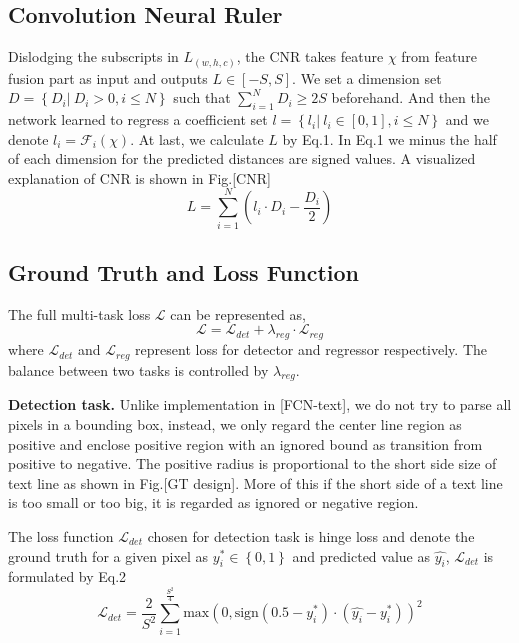 \documentclass[10pt,twocolumn,letterpaper]{article}
\begin{document}
	\subsection{Convolution Neural Ruler}
	Dislodging the subscripts in $L_{\left(w, h, c\right)}$, the CNR takes feature $\chi$ from feature fusion part as input and outputs $L \in \left[-S, S\right]$.
	We set a dimension set $D = \left\{D_i \vert \ D_i > 0, i \leq N \right\}$ such that $\sum_{i = 1}^{N} D_i \geq 2S$ beforehand.
	And then the network learned to regress a coefficient set $l = \left\{ l_i \vert \ l_i \in \left[ 0, 1 \right], i \leq N \right\}$ and we denote $l_i = \mathcal{F}_i \left( \chi \right)$.
	At last, we calculate $L$ by Eq.1. In Eq.1 we minus the half of each dimension for the predicted distances are signed values. A visualized explanation of CNR is shown in Fig.[CNR]
	\begin{equation}
		L = \sum_{i = 1}^{N} \left( l_i \cdot D_i - \frac{D_i}{2} \right)
	\end{equation}

	\subsection{Ground Truth and Loss Function}
	The full multi-task loss $\mathcal{L}$ can be represented as,
	\begin{equation}
		\mathcal{L} = \mathcal{L}_{det} + \lambda_{reg} \cdot \mathcal{L}_{reg}
	\end{equation}
	where $\mathcal{L}_{det}$ and $\mathcal{L}_{reg}$ represent loss for detector and regressor respectively. The balance between two tasks is controlled by $\lambda_{reg}$.
	
	\noindent \textbf{Detection task.}
	Unlike implementation in [FCN-text], we do not try to parse all pixels in a bounding box, instead, we only regard the center line region as positive and enclose positive region with an ignored bound as transition from positive to negative. The positive radius is proportional to the short side size of text line as shown in Fig.[GT design]. More of this if the short side of a text line is too small or too big, it is regarded as ignored or negative region. 

	The loss function $\mathcal{L}_{det}$ chosen for detection task is hinge loss and denote the ground truth for a given pixel as $y^{\ast}_{i} \in \left\{0, 1\right\}$ and predicted value as $\hat{y_{i}}$, $\mathcal{L}_{det}$ is formulated by Eq.2
	\begin{equation}
		\mathcal{L}_{det} = \frac{2}{S^{2}} \sum_{i = 1}^{\frac{S^{2}}{4}} \text{max}\left(0, \text{sign}\left(0.5 - y^{\ast}_{i}\right) \cdot \left(\hat{y_{i}} - y^{\ast}_{i} \right) \right)^{2}
	\end{equation}
\end{document}
